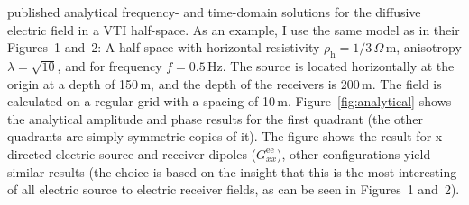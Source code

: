 \documentclass[manuscript,revised]{geophysics}
\begin{document}
\cite{PIER.10.Slob} published analytical frequency- and time-domain solutions
for the diffusive electric field in a VTI half-space. As an example, I use the
same model as \cite{GEO.15.Hunziker} in their Figures~1 and~2: A
half-space with horizontal resistivity $\rho_\mathrm{h} = 1/3\,\Omega$\,m,
anisotropy $\lambda = \sqrt{10}$, and for frequency $f = 0.5\,$Hz. The source
is located horizontally at the origin  at a depth of 150\,m, and the depth of the receivers is 200\,m. The
field is calculated on a regular grid with a spacing of 10\,m.
Figure~\ref{fig:analytical} shows the analytical amplitude and phase results
for the first quadrant (the other quadrants are simply symmetric copies of it).
%
%
The figure shows the result for x-directed electric source and receiver
dipoles ($G^\mathrm{ee}_{xx}$), other configurations yield similar results (the
choice is based on the insight that this is the most interesting of all
electric source to electric receiver fields, as can be seen in
\cite{GEO.15.Hunziker} Figures~1 and~2).
\end{document}
